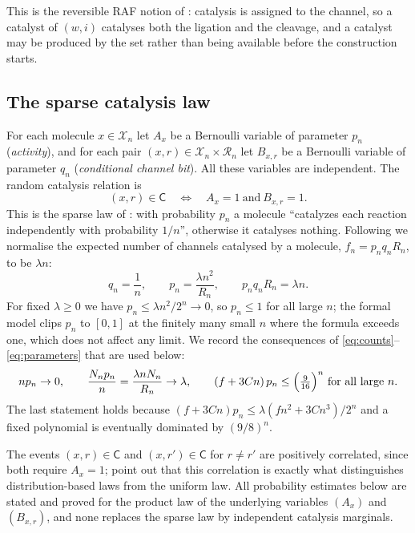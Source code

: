 \documentclass[11pt,a4paper]{article}
\theoremstyle{plain}
\theoremstyle{definition}
\theoremstyle{remark}
\newcommand{\cR}{\mathcal R}
\newcommand{\cX}{\mathcal X}
\begin{document}
This is the reversible RAF notion of \cite{hordijk2016variable}: catalysis is assigned to the channel, so a catalyst of $(w,i)$ catalyses both the ligation and the cleavage, and a catalyst may be produced by the set rather than being available before the construction starts.

\subsection{The sparse catalysis law}

For each molecule $x\in\cX_n$ let $A_x$ be a Bernoulli variable of parameter $p_n$ (\emph{activity}), and for each pair $(x,r)\in\cX_n\times\cR_n$ let $B_{x,r}$ be a Bernoulli variable of parameter $q_n$ (\emph{conditional channel bit}). All these variables are independent. The random catalysis relation is
\[
(x,r)\in\mathsf{C}\quad\Longleftrightarrow\quad A_x=1\ \text{and}\ B_{x,r}=1 .
\]
This is the sparse law of \cite[Section~2]{hordijk2016variable}: with probability $p_n$ a molecule ``catalyzes each reaction independently with probability $1/n$'', otherwise it catalyses nothing. Following \cite{hordijk2016variable} we normalise the expected number of channels catalysed by a molecule, $f_n=p_nq_nR_n$, to be $\lambda n$:
\begin{equation}\label{eq:parameters}
q_n=\frac1n,\qquad p_n=\frac{\lambda n^2}{R_n},\qquad p_nq_nR_n=\lambda n .
\end{equation}
For fixed $\lambda\ge0$ we have $p_n\le\lambda n^2/2^n\to0$, so $p_n\le1$ for all large $n$; the formal model clips $p_n$ to $[0,1]$ at the finitely many small $n$ where the formula exceeds one, which does not affect any limit. We record the consequences of \eqref{eq:counts}--\eqref{eq:parameters} that are used below:
\begin{equation}\label{eq:asymptotics}
np_n\to0,\qquad \frac{N_np_n}{n}=\frac{\lambda nN_n}{R_n}\to\lambda,\qquad (f+3Cn)\,p_n\le\Bigl(\tfrac{9}{16}\Bigr)^n\ \text{for all large }n .
\end{equation}
The last statement holds because $(f+3Cn)p_n\le\lambda(fn^2+3Cn^3)/2^n$ and a fixed polynomial is eventually dominated by $(9/8)^n$.

The events $(x,r)\in\mathsf{C}$ and $(x,r')\in\mathsf{C}$ for $r\ne r'$ are positively correlated, since both require $A_x=1$; \cite{hordijk2016variable} point out that this correlation is exactly what distinguishes distribution-based laws from the uniform law. All probability estimates below are stated and proved for the product law of the underlying variables $(A_x)$ and $(B_{x,r})$, and none replaces the sparse law by independent catalysis marginals.
\end{document}
